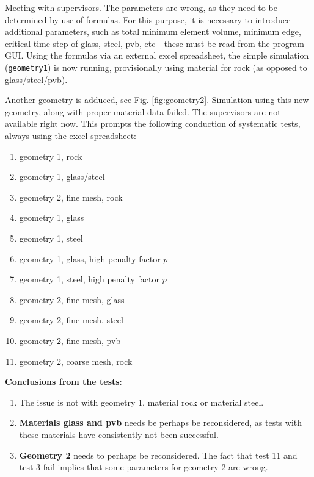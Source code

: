 \bigbreak
{}
Meeting with supervisors. The parameters are wrong, as they need to be determined by use of formulas. For this purpose, it is necessary to introduce additional parameters, such as total minimum element volume, minimum edge, critical time step of glass, steel, pvb, etc - these must be read from the program GUI. Using the formulas via an external excel spreadsheet, the simple simulation (\texttt{geometry1}) is now running, provisionally using material for rock (as opposed to glass/steel/pvb).

\bigbreak
{}
Another geometry is adduced, see Fig. \ref{fig:geometry2}. Simulation using this new geometry, along with proper material data failed. The supervisors are not available right now. This prompts the following conduction of systematic tests, always using the excel spreadsheet:

\begin{enumerate}[topsep=0pt,itemsep=-1ex,partopsep=1ex,parsep=1ex,label= {\color{blue}\textbf{test\arabic*}\,\,}]
    \item geometry 1, rock
    \item geometry 1, glass/steel
    \item geometry 2, fine mesh, rock
    \item geometry 1, glass
    \item geometry 1, steel
    \item geometry 1, glass, high penalty factor $p$
    \item geometry 1, steel, high penalty factor $p$
    \item geometry 2, fine mesh, glass
    \item geometry 2, fine mesh, steel
    \item geometry 2, fine mesh, pvb
    \item geometry 2, coarse mesh, rock
\end{enumerate}

\textbf{Conclusions from the tests}:

\begin{enumerate}[topsep=0pt,itemsep=-1ex,partopsep=1ex,parsep=1ex,label=\Alph*)]
    \item The issue is not with geometry 1, material rock or material steel.
    \item \textbf{Materials glass and pvb} needs be perhaps be reconsidered, as tests with these materials have consistently not been successful.
    \item \textbf{Geometry 2} needs to perhaps be reconsidered. The fact that test 11 and test 3 fail implies that some parameters for geometry 2 are wrong.
\end{enumerate}

